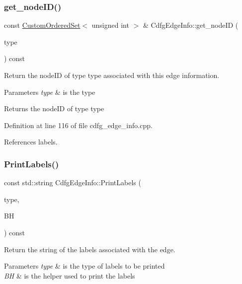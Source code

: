 \subsubsection{\texorpdfstring{get\+\_\+node\+I\+D()}{get\_nodeID()}}
{\footnotesize\ttfamily const \hyperlink{classCustomOrderedSet}{Custom\+Ordered\+Set}$<$ unsigned int $>$ \& Cdfg\+Edge\+Info\+::get\+\_\+node\+ID (\begin{DoxyParamCaption}\item[{const int}]{type }\end{DoxyParamCaption}) const}



Return the node\+ID of type type associated with this edge information. 


\begin{DoxyParams}{Parameters}
{\em type} & is the type \\
\hline
\end{DoxyParams}
\begin{DoxyReturn}{Returns}
the node\+ID of type type 
\end{DoxyReturn}


Definition at line 116 of file cdfg\+\_\+edge\+\_\+info.\+cpp.



References labels.

\mbox{\label{structCdfgEdgeInfo_a505a8d89775aa583b86bf84e5ddb91f9}} 
\subsubsection{\texorpdfstring{Print\+Labels()}{PrintLabels()}}
{\footnotesize\ttfamily const std\+::string Cdfg\+Edge\+Info\+::\+Print\+Labels (\begin{DoxyParamCaption}\item[{const int}]{type,  }\item[{const \hyperlink{behavioral__helper_8hpp_aae973b54cac87eef3b27442aa3e1e425}{Behavioral\+Helper\+Const\+Ref}}]{BH }\end{DoxyParamCaption}) const}



Return the string of the labels associated with the edge. 


\begin{DoxyParams}{Parameters}
{\em type} & is the type of labels to be printed \\
\hline
{\em BH} & is the helper used to print the labels \\
\hline
\end{DoxyParams}



